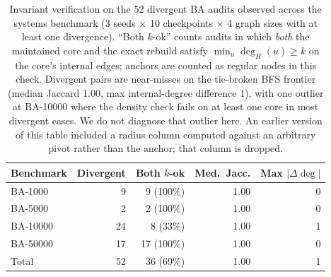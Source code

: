 \begin{table}[!htbp]
\centering\small
\begin{tabular}{@{}lrrrr@{}}
\toprule
Benchmark & Divergent & Both $k$-ok & Med.\ Jacc. & Max $|\Delta\deg|$\\
\midrule
BA-1000   & 9  & 9  (100\%) & 1.00 & 0\\
BA-5000   & 2  & 2  (100\%) & 1.00 & 0\\
BA-10000  & 24 & 8  (33\%)  & 1.00 & 1\\
BA-50000  & 17 & 17 (100\%) & 1.00 & 0\\
\midrule
Total     & 52 & 36 (69\%)  & 1.00 & 1\\
\bottomrule
\end{tabular}
\caption{Invariant verification on the 52 divergent BA audits observed
across the systems benchmark (3 seeds $\times$ 10 checkpoints $\times$
4 graph sizes with at least one divergence). ``Both $k$-ok'' counts
audits in which \emph{both} the maintained core and the exact rebuild
satisfy $\min_u \deg_H(u) \geq k$ on the core's internal edges;
anchors are counted as regular nodes in this check. Divergent pairs
are near-misses on the tie-broken BFS frontier (median Jaccard 1.00,
max internal-degree difference 1), with one outlier at BA-10000 where
the density check fails on at least one core in most divergent cases.
We do not diagnose that outlier here. An earlier version of this table
included a radius column computed against an arbitrary pivot rather
than the anchor; that column is dropped.}
\label{tab:invariants}
\end{table}